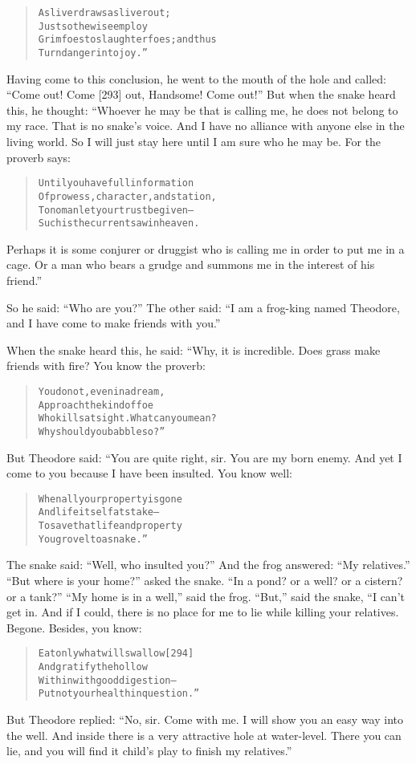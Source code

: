 \documentclass[article, twoside, 14pt]{memoir}
\renewenvironment{verbatim}{%
\begin{quote}%
\vskip -10pt%
\begin{alltt}\normalfont\large}{\end{alltt}%
\end{quote}%
\vskip -10pt
} %
\begin{document}
\begin{verbatim}
A sliver draws a sliver out;
    Just so the wise employ
Grim foes to slaughter foes; and thus
    Turn danger into joy.”
\end{verbatim}
Having come to this conclusion, he went to the mouth of the hole
and called: ``Come out! Come [293] out, Handsome! Come out!'' But
when the snake heard this, he thought: “Whoever he may be that is
calling me, he does not belong to my race. That is no snake's
voice. And I have no alliance with anyone else in the living world.
So I will just stay here until I am sure who he may be. For the
proverb says:

\begin{verbatim}
Until you have full information
Of prowess, character, and station,
To no man let your trust be given--
Such is the current saw in heaven.
\end{verbatim}
Perhaps it is some conjurer or druggist who is calling me in order
to put me in a cage. Or a man who bears a grudge and summons me in
the interest of his friend.”

So he said: ``Who are you?'' The other said:
``I am a frog-king named Theodore, and I have come to make friends with you.''

When the snake heard this, he said: “Why, it is incredible. Does
grass make friends with fire? You know the proverb:

\begin{verbatim}
You do not, even in a dream,
    Approach the kind of foe
Who kills at sight. What can you mean?
    Why should you babble so?”
\end{verbatim}
But Theodore said: “You are quite right, sir. You are my born
enemy. And yet I come to you because I have been insulted. You know
well:

\begin{verbatim}
When all your property is gone
    And life itself at stake--
To save that life and property
    You grovel to a snake.”
\end{verbatim}
The snake said: ``Well, who insulted you?'' And the frog answered:
``My relatives.'' ``But where is your home?'' asked the snake.
``In a pond? or a well? or a cistern? or a tank?''
``My home is in a well,'' said the frog. ``But,'' said the snake,
“I can't get in. And if I could, there is no place for me to lie
while killing your relatives. Begone. Besides, you know:

\begin{verbatim}
Eat only what will swallow                              [294]
And gratify the hollow
Within with good digestion--
Put not your health in question.”
\end{verbatim}
But Theodore replied:
``No, sir. Come with me. I will show you an easy way into the well. And inside there is a very attractive hole at water-level. There you can lie, and you will find it child's play to finish my relatives.''
\end{document}
